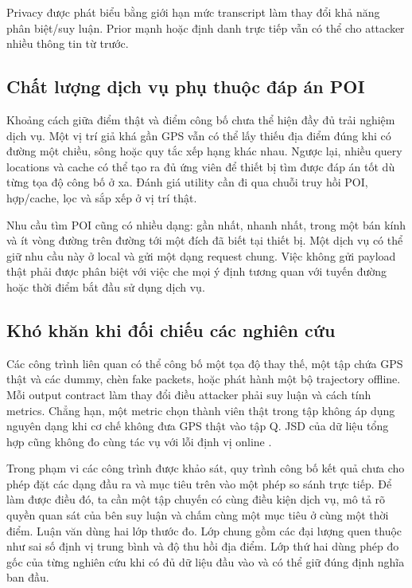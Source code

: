 Privacy được phát biểu bằng giới hạn mức transcript làm thay đổi khả năng phân biệt/suy luận.
Prior mạnh hoặc định danh trực tiếp vẫn có thể cho attacker nhiều thông tin từ trước.

\subsection{Chất lượng dịch vụ phụ thuộc đáp án POI}
Khoảng cách giữa điểm thật và điểm công bố chưa thể hiện đầy đủ trải nghiệm dịch vụ. Một vị trí giả
khá gần GPS vẫn có thể lấy thiếu địa điểm đúng khi có đường một chiều, sông hoặc quy tắc xếp hạng
khác nhau. Ngược lại, nhiều query locations và cache có thể tạo ra đủ ứng viên để thiết bị tìm được
đáp án tốt dù từng tọa độ công bố ở xa. Đánh giá utility cần đi qua chuỗi truy hồi POI, hợp/cache,
lọc và sắp xếp ở vị trí thật.

Nhu cầu tìm POI cũng có nhiều dạng: gần nhất, nhanh nhất, trong một bán kính và ít vòng đường trên
đường tới một đích đã biết tại thiết bị. Một dịch vụ có thể giữ nhu cầu này ở local và gửi một dạng
request chung. Việc không gửi payload thật phải được phân biệt với việc che mọi ý định tương quan
với tuyến đường hoặc thời điểm bắt đầu sử dụng dịch vụ.

\subsection{Khó khăn khi đối chiếu các nghiên cứu}
Các công trình liên quan có thể công bố một tọa độ thay thế, một tập chứa GPS thật và các dummy,
chèn fake packets, hoặc phát hành một bộ trajectory offline. Mỗi output contract làm thay đổi điều
attacker phải suy luận và cách tính metrics. Chẳng hạn, một metric chọn thành viên thật trong tập
không áp dụng nguyên dạng khi cơ chế không đưa GPS thật vào tập Q. JSD của dữ liệu tổng hợp cũng
không đo cùng tác vụ với lỗi định vị online \cite{semantic,fake,dpfetc,sok}.

Trong phạm vi các công trình được khảo sát, quy trình công bố kết quả chưa cho phép đặt các
dạng đầu ra và mục tiêu trên vào một phép so sánh trực tiếp. Để làm được điều đó, ta cần một tập
chuyến có cùng điều kiện dịch vụ, mô tả rõ quyền quan sát của bên suy luận và chấm cùng một mục
tiêu ở cùng một thời điểm. Luận văn dùng hai lớp thước đo. Lớp chung gồm các đại lượng quen thuộc
như sai số định vị trung bình và độ thu hồi địa điểm. Lớp thứ hai dùng phép đo gốc của từng
nghiên cứu khi có đủ dữ liệu đầu vào và có thể giữ đúng định nghĩa ban đầu.

